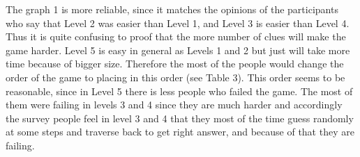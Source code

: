 The graph 1 is more reliable, since it matches the opinions of the participants who say that Level 2 was easier than Level 1, and Level 3 is easier than Level 4. Thus it is quite confusing to proof that the more number of clues will make the game harder. Level 5 is easy in general as Levels 1 and 2 but just will take more time because of bigger size. 
Therefore the most of the people would change the order of the game to placing in this order (see Table 3). This order seems to be reasonable, since in Level 5 there is less people who failed the game. The most of them were failing in levels 3 and 4 since they are much harder and accordingly the survey people feel in level 3 and 4 that they most of the time guess randomly at some steps and traverse back to get right answer, and because of that they are failing.\\




